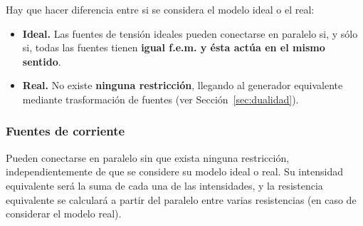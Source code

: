 		Hay que hacer diferencia entre si se considera el
                modelo ideal o el real:
		\begin{itemize}
                \item \textbf{Ideal.} Las fuentes de tensión ideales
                  pueden conectarse en paralelo si, y sólo si, todas
                  las fuentes tienen \textbf{igual f.e.m. y ésta actúa
                    en el mismo sentido}.
                \item \textbf{Real.} No existe \textbf{ninguna
                    restricción}, llegando al generador equivalente
                  mediante trasformación de fuentes (ver
                  Sección~\ref{sec:dualidad}).
		\end{itemize}
		
		\subsubsection{Fuentes de corriente}
		
		Pueden conectarse en paralelo sin que exista ninguna
                restricción, independientemente de que se considere su
                modelo ideal o real. Su intensidad equivalente será la
                suma de cada una de las intensidades, y la resistencia
                equivalente se calculará a partir del paralelo entre
                varias resistencias (en caso de considerar el modelo
                real).
	
